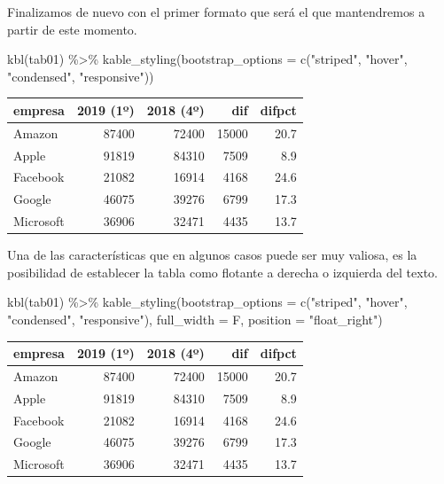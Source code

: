 \documentclass[
]{book}
\newenvironment{Shaded}{\begin{snugshade}}{\end{snugshade}}
\newcommand{\AttributeTok}[1]{\textcolor[rgb]{0.77,0.63,0.00}{#1}}
\newcommand{\FunctionTok}[1]{\textcolor[rgb]{0.00,0.00,0.00}{#1}}
\newcommand{\NormalTok}[1]{#1}
\newcommand{\SpecialCharTok}[1]{\textcolor[rgb]{0.00,0.00,0.00}{#1}}
\newcommand{\StringTok}[1]{\textcolor[rgb]{0.31,0.60,0.02}{#1}}
\begin{document}
Finalizamos de nuevo con el primer formato que será el que mantendremos a partir de este momento.

\begin{Shaded}
\begin{Highlighting}[]
\FunctionTok{kbl}\NormalTok{(tab01) }\SpecialCharTok{\%\textgreater{}\%}
  \FunctionTok{kable\_styling}\NormalTok{(}\AttributeTok{bootstrap\_options =} \FunctionTok{c}\NormalTok{(}\StringTok{"striped"}\NormalTok{, }\StringTok{"hover"}\NormalTok{,}
    \StringTok{"condensed"}\NormalTok{, }\StringTok{"responsive"}\NormalTok{))}
\end{Highlighting}
\end{Shaded}

\begin{table}
\centering
\begin{tabular}[t]{l|r|r|r|r}
\hline
empresa & 2019 (1º) & 2018 (4º) & dif & difpct\\
\hline
Amazon & 87400 & 72400 & 15000 & 20.7\\
\hline
Apple & 91819 & 84310 & 7509 & 8.9\\
\hline
Facebook & 21082 & 16914 & 4168 & 24.6\\
\hline
Google & 46075 & 39276 & 6799 & 17.3\\
\hline
Microsoft & 36906 & 32471 & 4435 & 13.7\\
\hline
\end{tabular}
\end{table}

Una de las características que en algunos casos puede ser muy valiosa, es la posibilidad de establecer la tabla como flotante a derecha o izquierda del texto.

\begin{Shaded}
\begin{Highlighting}[]
\FunctionTok{kbl}\NormalTok{(tab01) }\SpecialCharTok{\%\textgreater{}\%}
  \FunctionTok{kable\_styling}\NormalTok{(}\AttributeTok{bootstrap\_options =} \FunctionTok{c}\NormalTok{(}\StringTok{"striped"}\NormalTok{, }\StringTok{"hover"}\NormalTok{,}
    \StringTok{"condensed"}\NormalTok{, }\StringTok{"responsive"}\NormalTok{), }\AttributeTok{full\_width =}\NormalTok{ F, }\AttributeTok{position =} \StringTok{"float\_right"}\NormalTok{)}
\end{Highlighting}
\end{Shaded}

\begin{table}
\begin{tabular}[t]{l|r|r|r|r}
\hline
empresa & 2019 (1º) & 2018 (4º) & dif & difpct\\
\hline
Amazon & 87400 & 72400 & 15000 & 20.7\\
\hline
Apple & 91819 & 84310 & 7509 & 8.9\\
\hline
Facebook & 21082 & 16914 & 4168 & 24.6\\
\hline
Google & 46075 & 39276 & 6799 & 17.3\\
\hline
Microsoft & 36906 & 32471 & 4435 & 13.7\\
\hline
\end{tabular}\end{table}
\end{document}
